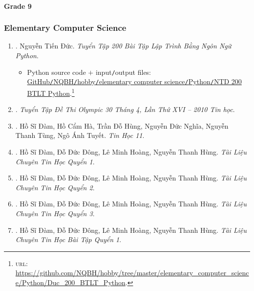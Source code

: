 \documentclass{article}
\begin{document}
\paragraph{Grade 9}

\subsubsection{Elementary Computer Science}

\begin{enumerate}
	\item \cite{Duc_200_BT_Python}. Nguyễn Tiến Đức. {\it Tuyển Tập 200 Bài Tập Lập Trình Bằng Ngôn Ngữ Python}.\hfill{\sf[reading]}
	\begin{itemize}
		\item Python source code $+$ input{\tt/}output files:\\\href{https://github.com/NQBH/hobby/tree/master/elementary_computer_science/Python/Duc_200_BTLT_Python}{GitHub{\tt/}NQBH{\tt/}hobby{\tt/}elementary computer science{\tt/}Python{\tt/}NTD 200 BTLT Python}.\footnote{\textsc{url}: \url{https://github.com/NQBH/hobby/tree/master/elementary_computer_science/Python/Duc_200_BTLT_Python}.}
	\end{itemize}

	\item \cite{Olympic30-4_2010_Tin_Hoc}. {\it Tuyển Tập Đề Thi Olympic 30 Tháng 4, Lần Thứ XVI -- 2010 Tin học}.\hfill{\sf[reading]}

	\item \cite{SGK_Tin_Hoc_11}. {\sc Hồ Sĩ Đàm, Hồ Cẩm Hà, Trần Đỗ Hùng, Nguyễn Đức Nghĩa, Nguyễn Thanh Tùng, Ngô Ánh Tuyết}. {\it Tin Học 11}.\hfill{\sf[done]}

	\item \cite{TL_chuyen_Tin_quyen_1}. {\sc Hồ Sĩ Đàm, Đỗ Đức Đông, Lê Minh Hoàng, Nguyễn Thanh Hùng}. {\it Tài Liệu Chuyên Tin Học Quyển 1}.\hfill{\sf[reading]}

	\item \cite{TL_chuyen_Tin_quyen_2}. {\sc Hồ Sĩ Đàm, Đỗ Đức Đông, Lê Minh Hoàng, Nguyễn Thanh Hùng}. {\it Tài Liệu Chuyên Tin Học Quyển 2}.\hfill{\sf[reading]}

	\item \cite{TL_chuyen_Tin_quyen_3}. {\sc Hồ Sĩ Đàm, Đỗ Đức Đông, Lê Minh Hoàng, Nguyễn Thanh Hùng}. {\it Tài Liệu Chuyên Tin Học Quyển 3}.\hfill{\sf[reading]}

	\item \cite{TL_chuyen_Tin_BT_quyen_1}. {\sc Hồ Sĩ Đàm, Đỗ Đức Đông, Lê Minh Hoàng, Nguyễn Thanh Hùng}. {\it Tài Liệu Chuyên Tin Học Bài Tập Quyển 1}.\hfill{\sf[reading]}


\end{enumerate}
\end{document}
